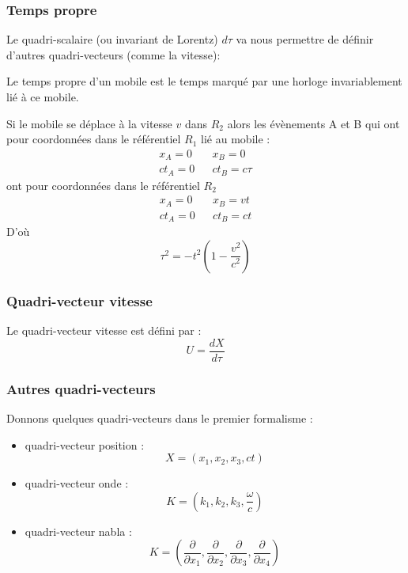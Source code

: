 \documentclass[12pt]{book}
\begin{document}
\subsubsection{Temps propre}
Le quadri-scalaire (ou invariant de Lorentz) $d\tau$ va nous
permettre de d\'efinir d'autres quadri-vecteurs (comme la vitesse):
\begin{defn}
Le temps propre d'un mobile est le temps marqu\'e par une horloge
invariablement li\'e \`a ce mobile.  
\end{defn}
Si le mobile se d\'eplace \`a la vitesse $v$ dans $R_2$ alors les \'ev\`enements A et B qui
ont pour coordonn\'ees dans le r\'ef\'erentiel $R_1$ li\'e au mobile :
\begin{eqnarray}
x_A=0& &x_B=0\\
ct_A=0& &ct_B=c\tau
\end{eqnarray}
ont pour coordonn\'ees dans le r\'ef\'erentiel $R_2$
\begin{eqnarray}
x_A=0& &x_B=vt\\
ct_A=0& &ct_B=ct
\end{eqnarray}
D'o\`u
\begin{equation}
\tau^2=-t^2(1-\frac{v^2}{c^2})
\end{equation}
\subsubsection{Quadri-vecteur vitesse}
Le  quadri-vecteur vitesse est d\'efini par :
\begin{equation}
U=\frac{dX}{d\tau}
\end{equation}
\subsubsection{Autres quadri-vecteurs}
Donnons quelques quadri-vecteurs dans le premier formalisme :
\begin{itemize}
\item quadri-vecteur position :
\begin{equation}
X=(x_1,x_2,x_3,ct)
\end{equation}
\item quadri-vecteur onde :
\begin{equation}
K=(k_1,k_2,k_3,\frac{\omega}{c})
\end{equation}
\item quadri-vecteur nabla :
\begin{equation}
K=(\frac{\partial}{\partial x_1},\frac{\partial}{\partial x_2},\frac{\partial}{\partial x_3},\frac{\partial}{\partial x_4})
\end{equation}
\end{itemize}
\end{document}
